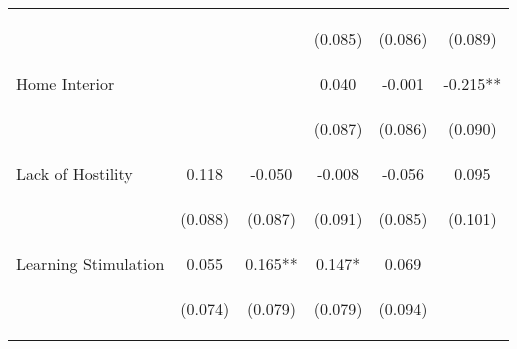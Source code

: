 \begin{tabular}{lccccc}
 & \begin{footnotesize}\end{footnotesize} & \begin{footnotesize}\end{footnotesize} & \begin{footnotesize}(0.085)\end{footnotesize} & \begin{footnotesize}(0.086)\end{footnotesize} & \begin{footnotesize}(0.089)\end{footnotesize}\\
\noalign{\smallskip}Home Interior &  &  & 0.040 & -0.001 & -0.215**\\
 & \begin{footnotesize}\end{footnotesize} & \begin{footnotesize}\end{footnotesize} & \begin{footnotesize}(0.087)\end{footnotesize} & \begin{footnotesize}(0.086)\end{footnotesize} & \begin{footnotesize}(0.090)\end{footnotesize}\\
\noalign{\smallskip}Lack of Hostility & 0.118 & -0.050 & -0.008 & -0.056 & 0.095\\
 & \begin{footnotesize}(0.088)\end{footnotesize} & \begin{footnotesize}(0.087)\end{footnotesize} & \begin{footnotesize}(0.091)\end{footnotesize} & \begin{footnotesize}(0.085)\end{footnotesize} & \begin{footnotesize}(0.101)\end{footnotesize}\\
\noalign{\smallskip}Learning Stimulation & 0.055 & 0.165** & 0.147* & 0.069 & \\
 & \begin{footnotesize}(0.074)\end{footnotesize} & \begin{footnotesize}(0.079)\end{footnotesize} & \begin{footnotesize}(0.079)\end{footnotesize} & \begin{footnotesize}(0.094)\end{footnotesize} & \begin{footnotesize}\end{footnotesize}\\

\end{tabular}
